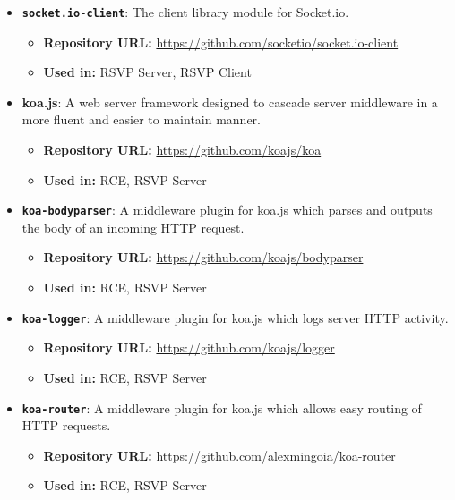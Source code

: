 \begin{itemize}
      \item \textbf{\texttt{socket.io-client}}: The client library module for Socket.io.
        \begin{itemize}
          \item \textbf{Repository URL:} \url{https://github.com/socketio/socket.io-client}
          \item \textbf{Used in:} RSVP Server, RSVP Client
        \end{itemize}
        
      \item \textbf{koa.js}: A web server framework designed to cascade server middleware in a more fluent and easier to maintain manner.
        \begin{itemize}
          \item \textbf{Repository URL:} \url{https://github.com/koajs/koa}
          \item \textbf{Used in:} RCE, RSVP Server
        \end{itemize}
        
      \item \textbf{\texttt{koa-bodyparser}}: A middleware plugin for koa.js which parses and outputs the body of an incoming HTTP request.
        \begin{itemize}
          \item \textbf{Repository URL:} \url{https://github.com/koajs/bodyparser}
          \item \textbf{Used in:} RCE, RSVP Server
        \end{itemize}
        
      \item \textbf{\texttt{koa-logger}}: A middleware plugin for koa.js which logs server HTTP activity.
        \begin{itemize}
          \item \textbf{Repository URL:} \url{https://github.com/koajs/logger}
          \item \textbf{Used in:} RCE, RSVP Server
        \end{itemize}
        
      \item \textbf{\texttt{koa-router}}: A middleware plugin for koa.js which allows easy routing of HTTP requests.
        \begin{itemize}
          \item \textbf{Repository URL:} \url{https://github.com/alexmingoia/koa-router}
          \item \textbf{Used in:} RCE, RSVP Server
        \end{itemize}
        

\end{itemize}
